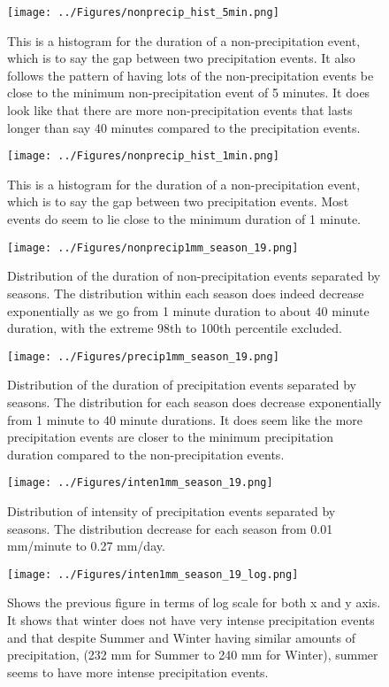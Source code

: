 \begin{figure}[h]
\centering \texttt{[image: ../Figures/nonprecip\_hist\_5min.png]} 
\caption{\label{abcg}This is a histogram for the duration of a
  non-precipitation event, which is to say the gap between two
  precipitation events. It also follows the pattern of having lots of
  the non-precipitation events be close to the minimum
  non-precipitation event of 5 minutes. It does look like that there
  are more non-precipitation events that lasts longer than say 40
  minutes compared to the precipitation events. }
\end{figure}
\begin{figure}[h]
\centering
\texttt{[image: ../Figures/nonprecip\_hist\_1min.png]}
\caption{\label{abch}This is a histogram for the duration of a
  non-precipitation event, which is to say the gap between two
  precipitation events. Most events do seem to lie close to the
  minimum duration of 1 minute.}
\end{figure}
\begin{figure}[h]
\centering 
\texttt{[image: ../Figures/nonprecip1mm\_season\_19.png]} 
\caption{\label{abci}Distribution of the duration of non-precipitation
  events separated by seasons. The distribution within each season
  does indeed decrease exponentially as we go from 1 minute duration
  to about 40 minute duration, with the extreme 98th to 100th
  percentile excluded.}
\end{figure}
\begin{figure}[h]
\centering
\texttt{[image: ../Figures/precip1mm\_season\_19.png]}
\caption{\label{abcj}Distribution of the duration of precipitation
  events separated by seasons. The distribution for each season does
  decrease exponentially from 1 minute to 40 minute durations. It does
  seem like the more precipitation events are closer to the minimum
  precipitation duration compared to the non-precipitation events.}
\end{figure}
\begin{figure}[h]
\centering \texttt{[image: ../Figures/inten1mm\_season\_19.png]} 
\caption{\label{abck}Distribution of intensity of precipitation events
  separated by seasons. The distribution decrease for each season from
  0.01 mm/minute to 0.27 mm/day.}
\end{figure}
\begin{figure}[h]
\centering
\texttt{[image: ../Figures/inten1mm\_season\_19\_log.png]}
\caption{\label{abcl}Shows the previous figure in terms of log scale
  for both x and y axis. It shows that winter does not have very
  intense precipitation events and that despite Summer and Winter
  having similar amounts of precipitation, (232 mm for Summer to 240
  mm for Winter), summer seems to have more intense precipitation
  events.}
\end{figure}
%
